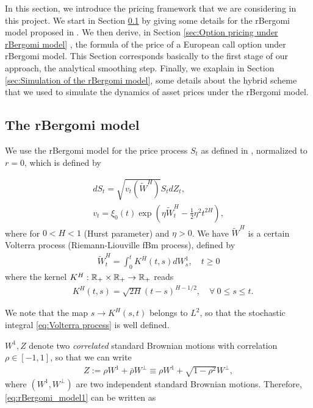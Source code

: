 In this section, we introduce the pricing framework that we are considering in this project. We start in Section \ref{sec:The rBergomi model} by giving some details for the rBergomi model proposed in \cite{bayer2016pricing}. We then derive, in Section \ref{sec:Option pricing under rBergomi model} ,  the formula of the price of a European call option under rBergomi model. This Section corresponds basically to the first stage of our approach, \ie the analytical smoothing step. Finally, we exaplain in Section \ref{sec:Simulation of the rBergomi model}, some details about the hybrid scheme that we used to simulate the dynamics of asset prices under the rBergomi model.

\subsection{The rBergomi model}\label{sec:The rBergomi model}

We use  the rBergomi model for the price process $S_t$ as defined in  \cite{bayer2016pricing}, normalized to $r=0$, which is defined by

\begin{align}\label{eq:rBergomi_model1}
	dS_t = \sqrt{v_t(\widetilde{W}^H)} S_t dZ_t, \nonumber \\
	v_t = \xi_0(t) \exp\left( \eta \widetilde{W}_t^H - \frac{1}{2} \eta^2 t^{2H} \right),
\end{align}
where for $0 < H < 1$ (Hurst parameter) and  $\eta>0$.  We have $\widetilde{W}^H $ is a certain Volterra process (Riemann-Liouville fBm
process),  defined by
\begin{align}\label{eq:Volterra process}
	\widetilde{W}_t^H = \int_0^t K^H(t,s) dW_s^1, \quad t \ge 0
\end{align}
where the kernel $K^H : \mathbb{R}_+ \times \mathbb{R}_+ \rightarrow \mathbb{R}_+$ reads
\begin{align*}
 \quad K^H(t,s) = \sqrt{2H} (t-s)^{H - 1/2},\quad \forall \: 0 \le s \le t.
\end{align*}

We note that the map $s \rightarrow K^H(s,t)$ belongs to $L^2$, so
that the stochastic integral \eqref{eq:Volterra process} is well defined.

$W^1, Z$ denote two \emph{correlated} standard Brownian motions with correlation $\rho \in [-1,1]$, so that we can write
\begin{align*}
	Z:=\rho	W^1+ \bar{\rho}W^\perp \equiv \rho W^1+\sqrt{1-\rho^2} W^\perp,
\end{align*}
where $(W^1,W^\perp)$ are two independent standard Brownian motions.
Therefore, \eqref{eq:rBergomi_model1} can be written as 

